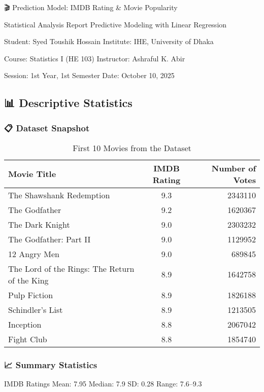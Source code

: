 \documentclass[
]{article}
\author{}
\date{\vspace{-2.5em}}
\begin{document}
{🎬 Prediction Model: IMDB Rating \& Movie Popularity}

Statistical Analysis Report \textbar{} Predictive Modeling with Linear
Regression

Student: Syed Toushik Hossain Institute: IHE, University of Dhaka

Course: Statistics I (HE 103) Instructor: Ashraful K. Abir

Session: 1st Year, 1st Semester Date: October 10, 2025

\subsection{📊 Descriptive Statistics}\label{descriptive-statistics}

\subsubsection{📋 Dataset Snapshot}\label{dataset-snapshot}

\begingroup\fontsize{8}{10}\selectfont

\begin{longtable}[t]{lcr}
\caption{\label{tab:dataset-snapshot}First 10 Movies from the Dataset}\\
\toprule
Movie Title & IMDB Rating & Number of Votes\\
\midrule
The Shawshank Redemption & 9.3 & 2343110\\
The Godfather & 9.2 & 1620367\\
The Dark Knight & 9.0 & 2303232\\
The Godfather: Part II & 9.0 & 1129952\\
12 Angry Men & 9.0 & 689845\\
\addlinespace
The Lord of the Rings: The Return of the King & 8.9 & 1642758\\
Pulp Fiction & 8.9 & 1826188\\
Schindler's List & 8.9 & 1213505\\
Inception & 8.8 & 2067042\\
Fight Club & 8.8 & 1854740\\
\bottomrule
\end{longtable}
\endgroup{}

\subsubsection{📈 Summary Statistics}\label{summary-statistics}

IMDB Ratings Mean: 7.95 \textbar{} Median: 7.9 SD: 0.28 \textbar{}
Range: 7.6--9.3
\end{document}
